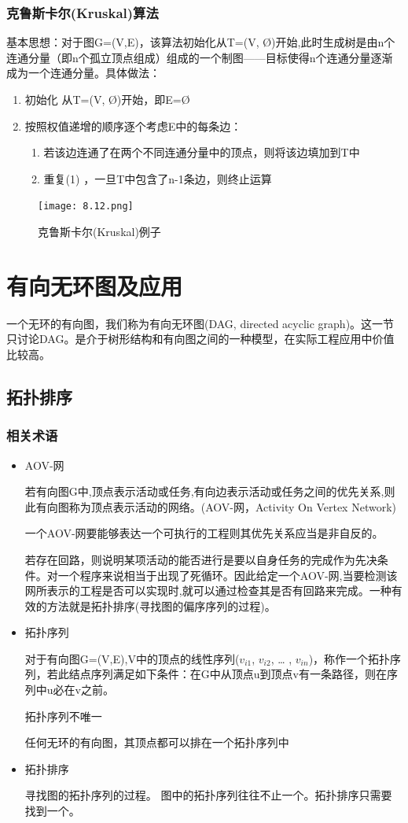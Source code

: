 \documentclass[AutoFakeBold]{LZUThesis2007}
\begin{document}
				\subsubsection{克鲁斯卡尔(Kruskal)算法}
基本思想：对于图G=(V,E)，该算法初始化从T=(V, Ø)开始,此时生成树是由n个连通分量（即n个孤立顶点组成）组成的一个制图——目标使得n个连通分量逐渐成为一个连通分量。具体做法：
					\begin{enumerate}
						\item 初始化
						从T=(V, Ø)开始，即E=Ø
						\item 按照权值递增的顺序逐个考虑E中的每条边：
							\begin{enumerate}
								\item 若该边连通了在两个不同连通分量中的顶点，则将该边填加到T中
								\item 重复(1) ，一旦T中包含了n-1条边，则终止运算
							\end{enumerate}
					\end{enumerate}
\begin{figure}[H]
    \centering
    \texttt{[image: 8.12.png]}
    \caption{克鲁斯卡尔(Kruskal)例子}
    \label{fig_install_texlive}
\end{figure}

	\section{有向无环图及应用}
一个无环的有向图，我们称为有向无环图(DAG, directed acyclic graph)。这一节只讨论DAG。是介于树形结构和有向图之间的一种模型，在实际工程应用中价值比较高。
		\subsection{拓扑排序}
			\subsubsection{相关术语}
\begin{itemize}
	\item AOV-网

若有向图G中,顶点表示活动或任务,有向边表示活动或任务之间的优先关系,则此有向图称为顶点表示活动的网络。(AOV-网，Activity On Vertex Network)

一个AOV-网要能够表达一个可执行的工程则其优先关系应当是非自反的。

若存在回路，则说明某项活动的能否进行是要以自身任务的完成作为先决条件。对一个程序来说相当于出现了死循环。因此给定一个AOV-网,当要检测该网所表示的工程是否可以实现时,就可以通过检查其是否有回路来完成。一种有效的方法就是拓扑排序(寻找图的偏序序列的过程)。
	\item 拓扑序列

对于有向图G=(V,E),V中的顶点的线性序列($v_{i1}$, $v_{i2}$, … , $v_{in}$)，称作一个拓扑序列，若此结点序列满足如下条件：在G中从顶点u到顶点v有一条路径，则在序列中u必在v之前。

拓扑序列不唯一

任何无环的有向图，其顶点都可以排在一个拓扑序列中

	\item 拓扑排序

寻找图的拓扑序列的过程。
图中的拓扑序列往往不止一个。拓扑排序只需要找到一个。
\end{itemize}
\end{document}
